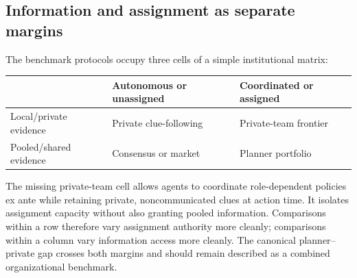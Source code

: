 \subsection{Information and assignment as separate margins}

The benchmark protocols occupy three cells of a simple institutional matrix:
\begin{center}
\small
\begin{tabular}{lll}
\toprule
& Autonomous or unassigned & Coordinated or assigned\\
\midrule
Local/private evidence & Private clue-following & Private-team frontier\\
Pooled/shared evidence & Consensus or market & Planner portfolio\\
\bottomrule
\end{tabular}
\end{center}
The missing private-team cell allows agents to coordinate role-dependent policies ex ante while retaining private, noncommunicated clues at action time. It isolates assignment capacity without also granting pooled information. Comparisons within a row therefore vary assignment authority more cleanly; comparisons within a column vary information access more cleanly. The canonical planner--private gap crosses both margins and should remain described as a combined organizational benchmark.
